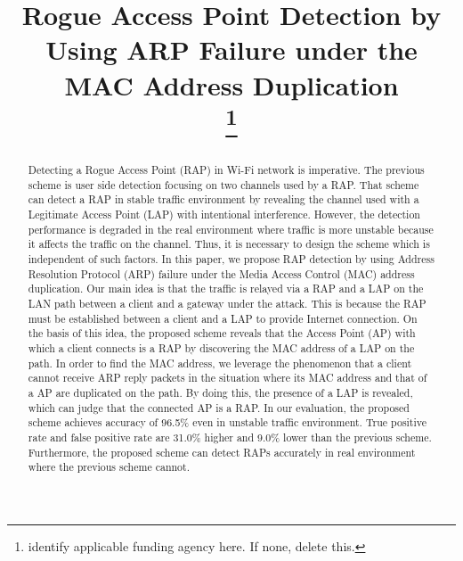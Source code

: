 \documentclass[conference]{IEEEtran}
\begin{document}
\title{Rogue Access Point Detection by Using ARP Failure under the MAC Address Duplication\\
\thanks{identify applicable funding agency here. If none, delete this.}
}

\author{
}
\maketitle
\begin{abstract}
Detecting a Rogue Access Point (RAP) in Wi-Fi network is imperative.
The previous scheme is user side detection focusing on two channels used by a RAP.
That scheme can detect a RAP in stable traffic environment by revealing the channel used with a Legitimate Access Point (LAP) with intentional interference.
However, the detection performance is degraded in the real environment where traffic is more unstable because it affects the traffic on the channel.
Thus, it is necessary to design the scheme which is independent of such factors.
In this paper, we propose RAP detection by using Address Resolution Protocol (ARP) failure under the Media Access Control (MAC) address duplication.
Our main idea is that the traffic is relayed via a RAP and a LAP on the LAN path between a client and a gateway under the attack.
This is because the RAP must be established between a client and a LAP to provide Internet connection.
    On the basis of this idea, the proposed scheme reveals that the Access Point (AP) with which a client connects is a RAP by discovering the MAC address of a LAP on the path.
In order to find the MAC address, we leverage the phenomenon that a client cannot receive ARP reply packets in the situation where its MAC address and that of a AP are duplicated on the path.
By doing this, the presence of a LAP is revealed, which can judge that the connected AP is a RAP.
In our evaluation, the proposed scheme achieves accuracy of 96.5\% even in unstable traffic environment.
True positive rate and false positive rate are 31.0\% higher and 9.0\% lower than the previous scheme.
Furthermore, the proposed scheme can detect RAPs accurately in real environment where the previous scheme cannot.
\end{abstract}
\end{document}

